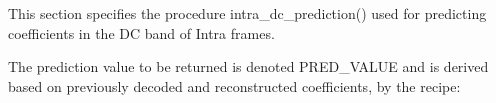 This section specifies the procedure intra\_dc\_prediction() used for
predicting coefficients in the DC band of Intra frames.

The prediction value to be returned is denoted PRED\_VALUE and is derived
based on previously decoded and reconstructed coefficients, by the
recipe:


